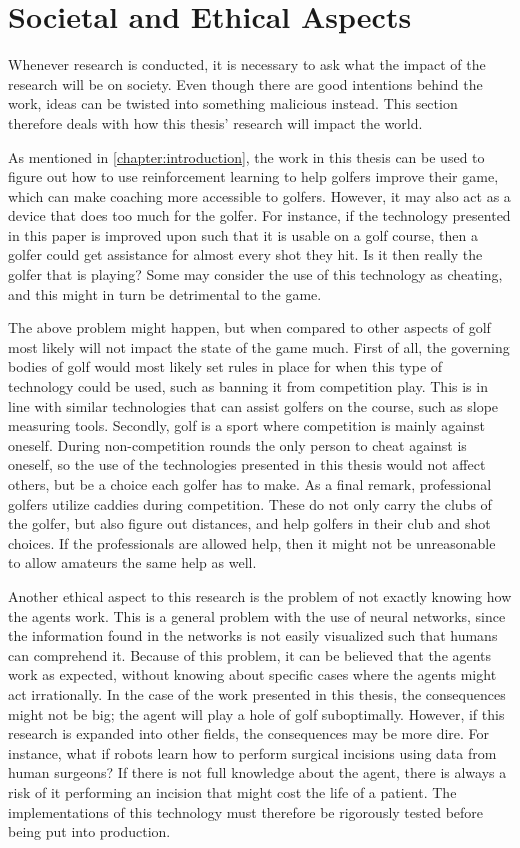 \documentclass{kththesis}
\begin{document}
\section{Societal and Ethical Aspects}
\label{sec:ethics}
Whenever research is conducted, it is necessary to ask what the impact of the research will be on society. Even though there are good intentions behind the work, ideas can be twisted into something malicious instead. This section therefore deals with how this thesis' research will impact the world.

As mentioned in \autoref{chapter:introduction}, the work in this thesis can be used to figure out how to use reinforcement learning to help golfers improve their game, which can make coaching more accessible to golfers. However, it may also act as a device that does too much for the golfer. For instance, if the technology presented in this paper is improved upon such that it is usable on a golf course, then a golfer could get assistance for almost every shot they hit. Is it then really the golfer that is playing? Some may consider the use of this technology as cheating, and this might in turn be detrimental to the game.

The above problem might happen, but when compared to other aspects of golf most likely will not impact the state of the game much. First of all, the governing bodies of golf would most likely set rules in place for when this type of technology could be used, such as banning it from competition play. This is in line with similar technologies that can assist golfers on the course, such as slope measuring tools. Secondly, golf is a sport where competition is mainly against oneself. During non-competition rounds the only person to cheat against is oneself, so the use of the technologies presented in this thesis would not affect others, but be a choice each golfer has to make. As a final remark, professional golfers utilize caddies during competition. These do not only carry the clubs of the golfer, but also figure out distances, and help golfers in their club and shot choices. If the professionals are allowed help, then it might not be unreasonable to allow amateurs the same help as well.

Another ethical aspect to this research is the problem of not exactly knowing how the agents work. This is a general problem with the use of neural networks, since the information found in the networks is not easily visualized such that humans can comprehend it. Because of this problem, it can be believed that the agents work as expected, without knowing about specific cases where the agents might act irrationally. In the case of the work presented in this thesis, the consequences might not be big; the agent will play a hole of golf suboptimally. However, if this research is expanded into other fields, the consequences may be more dire. For instance, what if robots learn how to perform surgical incisions using data from human surgeons? If there is not full knowledge about the agent, there is always a risk of it performing an incision that might cost the life of a patient. The implementations of this technology must therefore be rigorously tested before being put into production.
\end{document}
